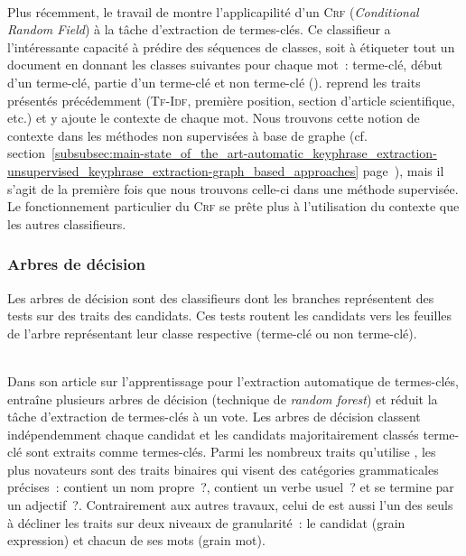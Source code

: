         ~\\Plus récemment, le travail de 
        montre l'applicapilité d'un \textsc{Crf} (\textit{Conditional Random
        Field}) à la tâche d'extraction de termes-clés. Ce classifieur a
        l'intéressante capacité à prédire des séquences de classes, soit à
        étiqueter tout un document en donnant les classes suivantes pour chaque
        mot~: \og{}terme-clé\fg{}, \og{}début d'un terme-clé\fg{}, \og{}partie
        d'un terme-clé\fg{} et \og{}non terme-clé\fg{} (). 
        reprend les traits présentés précédemment (\textsc{Tf-Idf}, première position,
        section d'article scientifique, etc.) et y ajoute le contexte de
        chaque mot. Nous trouvons cette notion de contexte dans les méthodes non
        supervisées à base de graphe (cf.
        section~\ref{subsubsec:main-state_of_the_art-automatic_keyphrase_extraction-unsupervised_keyphrase_extraction-graph_based_approaches}
        page~\pageref{subsubsec:main-state_of_the_art-automatic_keyphrase_extraction-unsupervised_keyphrase_extraction-graph_based_approaches}),
        mais il s'agit de la première fois que nous trouvons celle-ci dans une
        méthode supervisée. Le fonctionnement particulier du \textsc{Crf} se
        prête plus à l'utilisation du contexte que les autres classifieurs.

      \subsubsection{Arbres de décision}
      \label{subsubsec:main-state_of_the_art-automatic_keyphrase_extraction-supervised_keyphrase_extraction-decision_trees}
        Les arbres de décision sont des classifieurs dont les branches
        représentent des tests sur des traits des candidats. Ces tests routent
        les candidats vers les feuilles de l'arbre représentant leur classe
        respective (\og{}terme-clé\fg{} ou \og{}non terme-clé\fg{}).

        ~\\Dans son article sur l'apprentissage pour l'extraction automatique de
        termes-clés,  entraîne plusieurs
        arbres de décision (technique de \textit{random forest}) et réduit la
        tâche d'extraction de termes-clés à un vote. Les arbres de décision
        classent indépendemment chaque candidat et les candidats majoritairement
        classés \og{}terme-clé\fg{} sont extraits comme termes-clés. Parmi les
        nombreux traits qu'utilise , les
        plus novateurs sont des traits binaires qui visent des catégories
        grammaticales précises~: \og{}contient un nom propre~?\fg{},
        \og{}contient un verbe usuel~?\fg{} et \og{}se termine par un
        adjectif~?\fg{}. Contrairement aux autres travaux, celui de
         est aussi l'un des seuls à
        décliner les traits sur deux niveaux de granularité~: le candidat (grain
        expression) et chacun de ses mots (grain mot).

